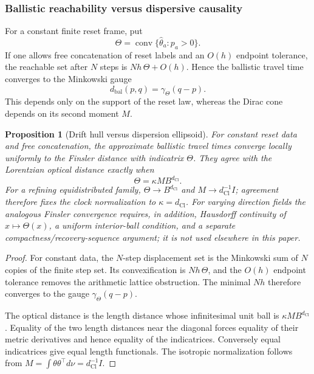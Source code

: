 \documentclass[11pt]{article}
\newtheorem{proposition}[theorem]{Proposition}
\theoremstyle{definition}
\theoremstyle{remark}
\newcommand{\dCl}{d_{\mathrm{Cl}}}
\begin{document}
\subsubsection{Ballistic reachability versus dispersive causality}

For a constant finite reset frame, put
\[
 \Theta=\operatorname{conv}\{\hat\theta_a:p_a>0\}.
\]
If one allows free concatenation of reset labels and an \(O(h)\) endpoint
tolerance, the reachable set after \(N\) steps is
\(Nh\,\Theta+O(h)\).  Hence the ballistic travel time converges to the
Minkowski gauge
\[
 d_{\mathrm{bal}}(p,q)=\gamma_\Theta(q-p).
\]
This depends only on the support of the reset law, whereas the Dirac cone depends
on its second moment \(M\).

\begin{proposition}[Drift hull versus dispersion ellipsoid]
\label{prop:drift-dispersion}
For constant reset data and free concatenation, the approximate ballistic
travel times converge locally uniformly to the Finsler distance with indicatrix
\(\Theta\).  They agree with the Lorentzian optical distance exactly when
\[
 \Theta=\kappa MB^{\dCl}.
\]
For a refining equidistributed family,
\(\Theta\to B^{\dCl}\) and \(M\to \dCl^{-1}I\); agreement therefore fixes the
clock normalization to \(\kappa=\dCl\).  For varying direction fields the
analogous Finsler convergence requires, in addition, Hausdorff continuity of
\(x\mapsto\Theta(x)\), a uniform interior-ball condition, and a separate
compactness/recovery-sequence argument; it is not used elsewhere in this paper.
\end{proposition}

\begin{proof}
For constant data, the \(N\)-step displacement set is the Minkowski sum of
\(N\) copies of the finite step set.  Its convexification is \(Nh\,\Theta\), and
the \(O(h)\) endpoint tolerance removes the arithmetic lattice obstruction.
The minimal \(Nh\) therefore converges to the gauge
\(\gamma_\Theta(q-p)\).

The optical distance is the length distance whose infinitesimal unit ball is
\(\kappa MB^{\dCl}\).  Equality of the two length distances near the diagonal
forces equality of their metric derivatives and hence equality of the
indicatrices.  Conversely equal indicatrices give equal length functionals.
The isotropic normalization follows from
\(M=\int\theta\theta^\top d\nu=\dCl^{-1}I\).
\end{proof}
\end{document}
